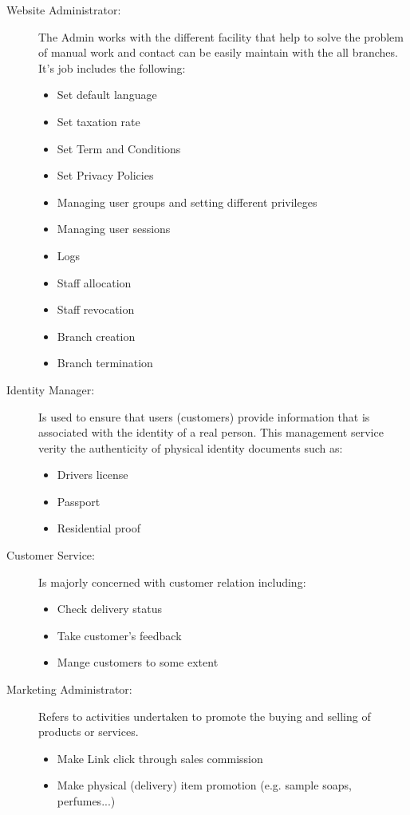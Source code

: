 \begin{description}
	\item[Website Administrator:] The Admin works with the different facility that help to solve the problem of manual work and contact can be easily maintain with the all branches. It's job includes the following:
	\begin{itemize}
		\item Set default language
		\item Set taxation rate
		\item Set Term and Conditions
		\item Set Privacy Policies
		\item Managing user groups and setting different privileges
		\item Managing user sessions
		\item Logs
		\item Staff allocation
		\item Staff revocation
		\item Branch creation
		\item Branch termination	
	\end{itemize}
	\item[Identity Manager:] Is used to ensure that users (customers) provide information that is associated with the identity of a real person. This management service verity the authenticity of physical identity documents such as:
	\begin{itemize}
		\item Drivers license
		\item Passport
		\item Residential proof
	\end{itemize}
	\item[Customer Service:] Is majorly concerned with customer relation including:
	\begin{itemize}
		\item Check delivery status
		\item Take customer's feedback
		\item Mange customers to some extent 
	\end{itemize}
	\item[Marketing Administrator:] Refers to activities undertaken to promote the buying and selling of products or services.
	\begin{itemize}
		\item Make Link click through sales commission
		\item Make physical (delivery) item promotion (e.g. sample soaps, perfumes...)

\end{itemize}
\end{description}
